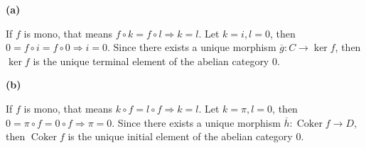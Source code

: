 \documentclass[leqno]{article}
\DeclareMathOperator{\coker}{Coker}
\begin{document}
\textbf{(a)}

\fbox{$\Rightarrow$} If $f$ is mono, that means  $f\circ k =f\circ l \Rightarrow k=l$. Let $k = i, l = 0$, then $0=f\circ i=f\circ 0\Rightarrow i=0$. Since there exists a unique morphism $\overline{g}:C\to \ker f$, then $\ker f$ is the unique terminal element of the abelian category $0$.

\textbf{(b)}

\fbox{$\Rightarrow$} If $f$ is mono, that means  $k\circ f =l\circ f \Rightarrow k=l$. Let $k = \pi, l = 0$, then $0=\pi\circ f=0\circ f\Rightarrow \pi=0$. Since there exists a unique morphism $\overline{h}:\coker f\to D$, then $\coker f$ is the unique initial element of the abelian category $0$.
\end{document}
